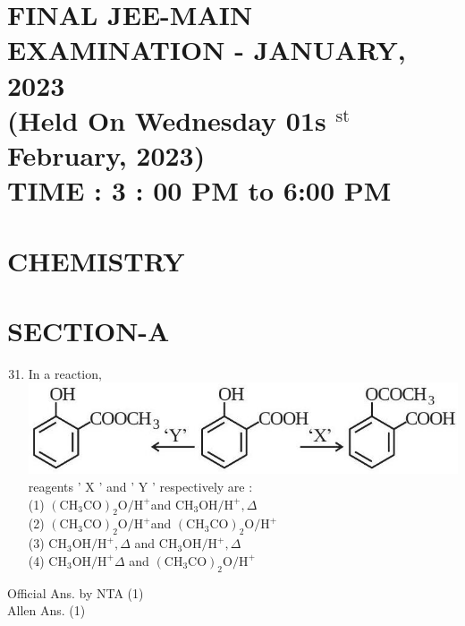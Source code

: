 \documentclass[10pt]{article}
\begin{document}
\captionsetup{singlelinecheck=false}
\section*{FINAL JEE-MAIN EXAMINATION - JANUARY, 2023 \\
 (Held On Wednesday 01s \({ }^{\text {st }}\) February, 2023) \\
 TIME : 3 : 00 PM to 6:00 PM}
\section*{CHEMISTRY}
\section*{SECTION-A}
\begin{enumerate}
  \setcounter{enumi}{30}
  \item In a reaction,\\
\includegraphics[max width=\textwidth, center]{2025_10_02_a54bf82dc4585184bb5fg-1(5)}\\
reagents ' X ' and ' Y ' respectively are :\\
(1) \(\left(\mathrm{CH}_{3} \mathrm{CO}\right)_{2} \mathrm{O} / \mathrm{H}^{+}\)and \(\mathrm{CH}_{3} \mathrm{OH} / \mathrm{H}^{+}, \Delta\)\\
(2) \(\left(\mathrm{CH}_{3} \mathrm{CO}\right)_{2} \mathrm{O} / \mathrm{H}^{+}\)and \(\left(\mathrm{CH}_{3} \mathrm{CO}\right)_{2} \mathrm{O} / \mathrm{H}^{+}\)\\
(3) \(\mathrm{CH}_{3} \mathrm{OH} / \mathrm{H}^{+}, \Delta\) and \(\mathrm{CH}_{3} \mathrm{OH} / \mathrm{H}^{+}, \Delta\)\\
(4) \(\mathrm{CH}_{3} \mathrm{OH} / \mathrm{H}^{+} \Delta\) and \(\left(\mathrm{CH}_{3} \mathrm{CO}\right)_{2} \mathrm{O} / \mathrm{H}^{+}\)
\end{enumerate}

Official Ans. by NTA (1)\\
Allen Ans. (1)
\end{document}
